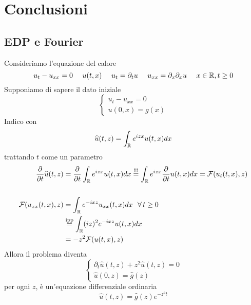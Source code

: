 \chapter{Conclusioni}

\section{EDP e Fourier}

Consideriamo l'equazione del calore
\begin{equation*}
u_{t} - u_{xx} = 0\ \ \ \ u(t, x) \ \ \ \ u_{t} = \partial_{t} u\ \ \ \ u_{xx} = \partial_{x} \partial_{x} u\ \ \ \ x\in \mathbb{R}, t\geq 0
\end{equation*}
Supponiamo di sapere il dato iniziale
\begin{equation*}
\begin{cases}
u_{t} - u_{xx} = 0\\
u(0, x) = g(x)
\end{cases}
\end{equation*}
Indico con
\begin{equation*}
\widehat{u}(t, z) = \int_{\mathbb{R}} e^{izx} u(t, x) dx
\end{equation*}
trattando $t$ come un parametro
\begin{equation*}
\begin{aligned}
\frac{\partial}{\partial t}\hat{u}(t, z) & = \frac{\partial}{\partial t}\int_{\RR} e^{izx} u(t, x) dx\overset{!!!}{=}\int_{\RR} e^{izx}\frac{\partial}{\partial t} u(t, x) dx = \Fc(u_{t}(t, x), z)\\
 & \\
\Fc(u_{xx}(t, x), z) & = \int_{\RR} e^{- ixz} u_{xx}(t, x) dx\ \ \forall t\geq 0\\
 & \overset{\text{ipp}}{=}\int_{\RR}(iz)^{2} e^{- ixz} u(t, x) dx\\
 & = - z^{2}\Fc(u(t, x), z)
\end{aligned}
\end{equation*}
Allora il problema diventa
\begin{equation*}
\begin{cases}
\partial_{t}\hat{u}(t, z) + z^{2}\hat{u}(t, z) = 0\\
\hat{u}(0, z) = \hat{g}(z)
\end{cases}
\end{equation*}
per ogni $z$, è un'equazione differenziale ordinaria
\begin{equation*}
\hat{u}(t, z) = \hat{g}(z) e^{- z^{2} t}
\end{equation*}
